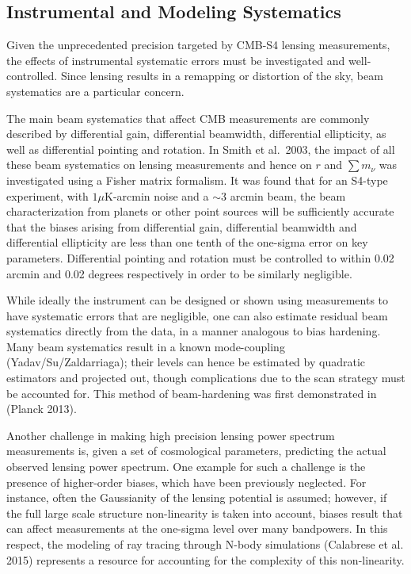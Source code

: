 \subsection{Instrumental and Modeling Systematics}\label{systInst}
 	
Given the unprecedented precision targeted by CMB-S4 lensing measurements, the effects of instrumental systematic errors must be investigated and well-controlled. Since lensing results in a remapping or distortion of the sky, beam systematics are a particular concern. 

The main beam systematics that affect CMB measurements are commonly described by differential gain, differential beamwidth, differential ellipticity, as well as differential pointing and rotation. In Smith et al.~2003, the impact of all these beam systematics on lensing measurements and hence on $r$ and $\sum m_\nu$ was investigated using a Fisher matrix formalism. It was found that for an S4-type experiment, with $1 \mu $K-arcmin noise and a $\sim 3$ arcmin beam, the beam characterization from planets or other point sources will be sufficiently accurate that the biases arising from differential gain, differential beamwidth and differential ellipticity are less than one tenth of the one-sigma error on key parameters. Differential pointing and rotation must be controlled to within 0.02 arcmin and 0.02 degrees respectively in order to be similarly negligible.

While ideally the instrument can be designed or shown using measurements to have systematic errors that are negligible, one can also estimate residual beam systematics directly from the data, in a manner analogous to bias hardening. Many beam systematics result in a known mode-coupling (Yadav/Su/Zaldarriaga); their levels can hence be estimated by quadratic estimators and projected out, though complications due to the scan strategy must be accounted for. This method of beam-hardening was first demonstrated in (Planck 2013).

Another challenge in making high precision lensing power spectrum measurements is, given a set of cosmological parameters, predicting the actual observed lensing power spectrum. One example for such a challenge is the presence of higher-order biases, which have been previously neglected. For instance, often the Gaussianity of the lensing potential is assumed; however, if the full large scale structure non-linearity is taken into account, biases result that can affect measurements at the one-sigma level over many bandpowers. In this respect, the modeling of ray tracing through N-body simulations (Calabrese et al. 2015) %
represents a resource for accounting for the complexity of this non-linearity.


